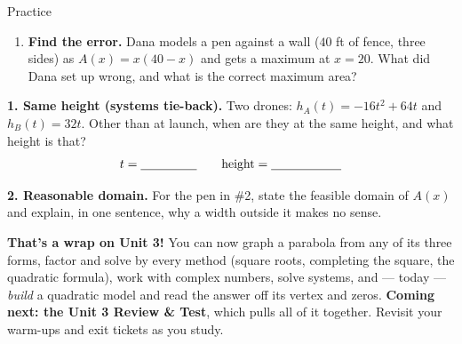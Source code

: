 \documentclass[10pt]{article}
\begin{document}
\begin{notesbox}{Practice}
\begin{enumerate}[leftmargin=1.9em, itemsep=9pt]
  \item \textbf{Find the error.} Dana models a pen against a wall ($40$ ft of fence, three sides) as $A(x)=x(40-x)$
        and gets a maximum at $x=20$. What did Dana set up wrong, and what is the correct maximum area?
        \writeline
\end{enumerate}
\end{notesbox}

\begin{extensionbox}
\textbf{1. Same height (systems tie-back).} Two drones: $h_A(t)=-16t^2+64t$ and $h_B(t)=32t$. Other than at launch,
when are they at the same height, and what height is that?
\[ t=\blank{1.6cm} \qquad \text{height}=\blank{2.0cm} \]

\textbf{2. Reasonable domain.} For the pen in \#2, state the feasible domain of $A(x)$ and explain, in one sentence,
why a width outside it makes no sense. \writeline
\end{extensionbox}

\begin{spiralbox}
\textbf{That's a wrap on Unit 3!} You can now graph a parabola from any of its three forms, factor and solve by every
method (square roots, completing the square, the quadratic formula), work with complex numbers, solve systems, and
--- today --- \emph{build} a quadratic model and read the answer off its vertex and zeros. \textbf{Coming next: the
Unit 3 Review \& Test}, which pulls all of it together. Revisit your warm-ups and exit tickets as you study.
\end{spiralbox}
\end{document}
